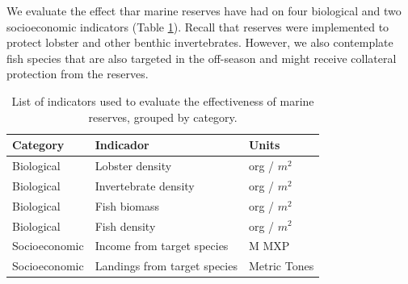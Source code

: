\documentclass{frontiersSCNS}
\theoremstyle{definition}
\theoremstyle{definition}
\theoremstyle{definition}
\theoremstyle{remark}
\begin{document}
We evaluate the effect thar marine reserves have had on four biological
and two socioeconomic indicators (Table \ref{table:indicators}). Recall
that reserves were implemented to protect lobster and other benthic
invertebrates. However, we also contemplate fish species that are also
targeted in the off-season and might receive collateral protection from
the reserves.

\begin{table}[H]

\caption{\label{tab:unnamed-chunk-3}\label{table:indicators}List of indicators used to evaluate the effectiveness of marine reserves, grouped by category.}
\centering
\begin{tabular}[t]{l|l|l}
\hline
Category & Indicador & Units\\
\hline
Biological & Lobster density & org / $m^2$\\
\hline
Biological & Invertebrate density & org / $m^2$\\
\hline
Biological & Fish biomass & org / $m^2$\\
\hline
Biological & Fish density & org / $m^2$\\
\hline
Socioeconomic & Income from target species & M MXP\\
\hline
Socioeconomic & Landings from target species & Metric Tones\\
\hline
\end{tabular}
\end{table}
\end{document}
